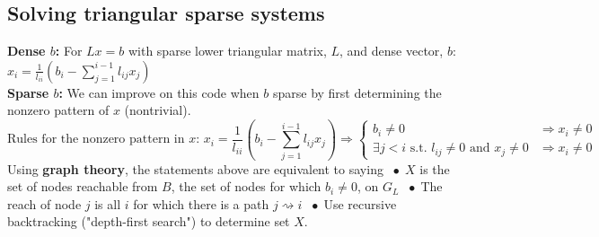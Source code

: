 \documentclass{article}
\newcommand*\bspace{$\; \bullet \;$}
\begin{document}
\subsection{Solving triangular sparse systems}
\textbf{Dense $b$:} For $Lx=b$ with sparse lower triangular matrix, $L$, and dense vector, $b$: $x_i = \frac{1}{l_{ii}}\left(b_i - \sum_{j=1}^{i-1}l_{ij}x_j\right)$\\
\textbf{Sparse $b$:} We can improve on this code when $b$ sparse by first determining the nonzero pattern of $x$ (nontrivial).
\begin{equation*}
    \textrm{Rules for the nonzero pattern in $x$: } x_i = \frac{1}{l_{ii}}\left(b_i - \sum_{j=1}^{i-1}l_{ij}x_j\right) \Longrightarrow 
    \begin{cases}
        b_i \neq 0 & \Rightarrow x_i \neq 0\\
        \exists j<i \textrm{ s.t. } l_{ij} \neq 0 \textrm{ and } x_j \neq 0 & \Rightarrow x_i \neq 0
    \end{cases}
\end{equation*}
Using \textbf{graph theory}, the statements above are equivalent to saying \bspace $X$ is the set of nodes reachable from $B$, the set of nodes for which $b_i \neq 0$, on $G_L$ \bspace The reach of node $j$ is  all $i$ for which there is a path $j \rightsquigarrow i$ \bspace Use recursive backtracking ("depth-first search") to determine set $X$.
\end{document}
